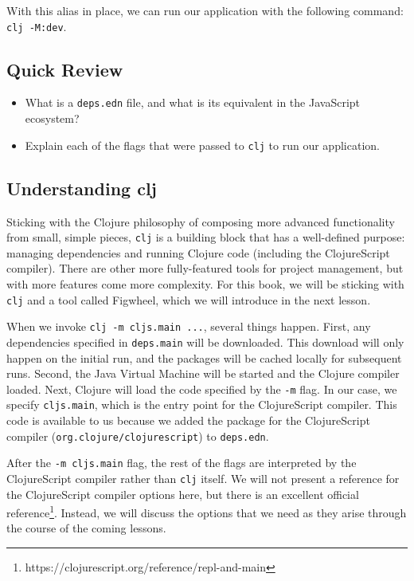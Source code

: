 \documentclass[10pt,twoside,openright]{memoir}
\begin{document}
With this alias in place, we can run our application with the following
command: \texttt{clj\ -M:dev}.

\subsection{Quick Review}

\begin{itemize}
\tightlist
\item
  What is a \texttt{deps.edn} file, and what is its equivalent in the
  JavaScript ecosystem?
\item
  Explain each of the flags that were passed to \texttt{clj} to run our
  application.
\end{itemize}

\subsection{Understanding clj}

Sticking with the Clojure philosophy of composing more advanced
functionality from small, simple pieces, \texttt{clj} is a building
block that has a well-defined purpose: managing dependencies and running
Clojure code (including the ClojureScript compiler). There are other
more fully-featured tools for project management, but with more features
come more complexity. For this book, we will be sticking with
\texttt{clj} and a tool called Figwheel, which we will introduce in the
next lesson.

When we invoke \texttt{clj\ -m\ cljs.main\ ...}, several things happen.
First, any dependencies specified in \texttt{deps.main} will be
downloaded. This download will only happen on the initial run, and the
packages will be cached locally for subsequent runs. Second, the Java
Virtual Machine will be started and the Clojure compiler loaded. Next,
Clojure will load the code specified by the \texttt{-m} flag. In our
case, we specify \texttt{cljs.main}, which is the entry point for the
ClojureScript compiler. This code is available to us because we added
the package for the ClojureScript compiler
(\texttt{org.clojure/clojurescript}) to \texttt{deps.edn}.

After the \texttt{-m\ cljs.main} flag, the rest of the flags are
interpreted by the ClojureScript compiler rather than \texttt{clj}
itself. We will not present a reference for the ClojureScript compiler
options here, but there is an excellent official reference\footnote{https://clojurescript.org/reference/repl-and-main}. Instead, we will
discuss the options that we need as they arise through the course of the
coming lessons.
\end{document}

